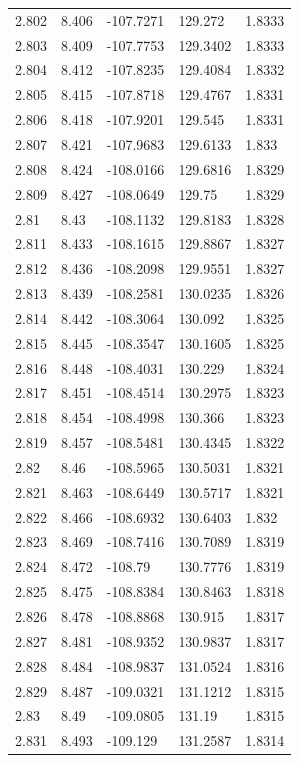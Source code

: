 \begin{tabular}{lllll}
2.802 & 8.406 & -107.7271 & 129.272 & 1.8333 \\
2.803 & 8.409 & -107.7753 & 129.3402 & 1.8333 \\
2.804 & 8.412 & -107.8235 & 129.4084 & 1.8332 \\
2.805 & 8.415 & -107.8718 & 129.4767 & 1.8331 \\
2.806 & 8.418 & -107.9201 & 129.545 & 1.8331 \\
2.807 & 8.421 & -107.9683 & 129.6133 & 1.833 \\
2.808 & 8.424 & -108.0166 & 129.6816 & 1.8329 \\
2.809 & 8.427 & -108.0649 & 129.75 & 1.8329 \\
2.81 & 8.43 & -108.1132 & 129.8183 & 1.8328 \\
2.811 & 8.433 & -108.1615 & 129.8867 & 1.8327 \\
2.812 & 8.436 & -108.2098 & 129.9551 & 1.8327 \\
2.813 & 8.439 & -108.2581 & 130.0235 & 1.8326 \\
2.814 & 8.442 & -108.3064 & 130.092 & 1.8325 \\
2.815 & 8.445 & -108.3547 & 130.1605 & 1.8325 \\
2.816 & 8.448 & -108.4031 & 130.229 & 1.8324 \\
2.817 & 8.451 & -108.4514 & 130.2975 & 1.8323 \\
2.818 & 8.454 & -108.4998 & 130.366 & 1.8323 \\
2.819 & 8.457 & -108.5481 & 130.4345 & 1.8322 \\
2.82 & 8.46 & -108.5965 & 130.5031 & 1.8321 \\
2.821 & 8.463 & -108.6449 & 130.5717 & 1.8321 \\
2.822 & 8.466 & -108.6932 & 130.6403 & 1.832 \\
2.823 & 8.469 & -108.7416 & 130.7089 & 1.8319 \\
2.824 & 8.472 & -108.79 & 130.7776 & 1.8319 \\
2.825 & 8.475 & -108.8384 & 130.8463 & 1.8318 \\
2.826 & 8.478 & -108.8868 & 130.915 & 1.8317 \\
2.827 & 8.481 & -108.9352 & 130.9837 & 1.8317 \\
2.828 & 8.484 & -108.9837 & 131.0524 & 1.8316 \\
2.829 & 8.487 & -109.0321 & 131.1212 & 1.8315 \\
2.83 & 8.49 & -109.0805 & 131.19 & 1.8315 \\
2.831 & 8.493 & -109.129 & 131.2587 & 1.8314 \\

\end{tabular}
